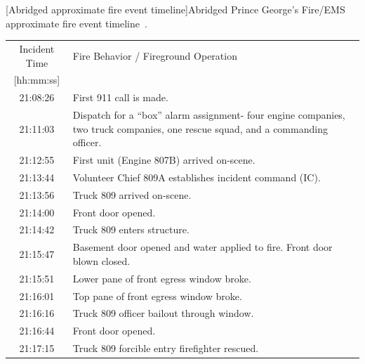\documentclass[12pt,oneside]{book}
\begin{document}
\begin{table}[!h]
\centering
{}[Abridged approximate fire event timeline]{Abridged Prince George's Fire/EMS approximate fire event timeline~\cite{PGCounty2013}.}\label{tab:fire_info}
\begin{tabular}{cl}
\toprule[1.5pt]
Incident Time              &  Fire Behavior / Fireground Operation  \\
{[hh:mm:ss]}               &                                        \\
\midrule
21:08:26   & First 911 call is made. \\[.25cm]
\multirow{3}{*}{21:11:03}  &   \multirow{3}{*}{\parbox{10cm} {Dispatch for a ``box'' alarm assignment- four engine companies, two truck companies, one rescue squad, and a commanding officer.}}    \\
                           &         \\
                           &         \\[.25cm]
21:12:55  &  First unit (Engine 807B) arrived on-scene.  \\[.25cm]
21:13:44  & Volunteer Chief 809A establishes incident command (IC).   \\[.25cm]
21:13:56  & Truck 809 arrived on-scene. \\[.25cm]
21:14:00  & Front door opened. \\[.25cm]
21:14:42  & Truck 809 enters structure. \\[.25cm]
21:15:47  & Basement door opened and water applied to fire. Front door blown closed. \\[.25cm]
21:15:51  & Lower pane of front egress window broke. \\[.25cm]
21:16:01  & Top pane of front egress window broke. \\[.25cm]
21:16:16  & Truck 809 officer bailout through window. \\[.25cm]
21:16:44  & Front door opened. \\[.25cm]
21:17:15  & Truck 809 forcible entry firefighter rescued. \\[.25cm]
\bottomrule[1.25pt]
\end{tabular}\par
\end{table}
\end{document}
